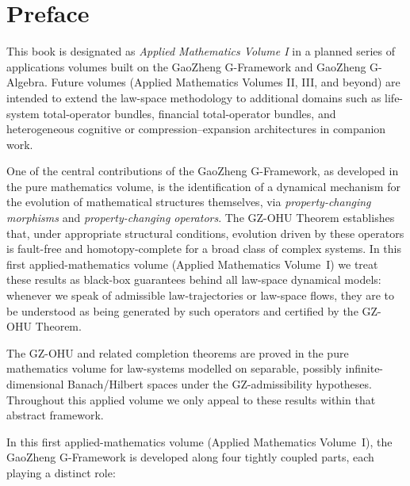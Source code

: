 \documentclass[11pt]{book}
\theoremstyle{plain}
\theoremstyle{definition}
\theoremstyle{remark}
\begin{document}
\chapter*{Preface}
\noindent This book is designated as \emph{Applied Mathematics Volume I} in a planned
series of applications volumes built on the GaoZheng G-Framework and GaoZheng
G-Algebra. Future volumes (Applied Mathematics Volumes II, III, and beyond)
are intended to extend the law-space methodology to additional domains such as
life-system total-operator bundles, financial total-operator bundles, and
heterogeneous cognitive or compression--expansion architectures in companion
work.


One of the central contributions of the GaoZheng G-Framework, as
developed in the pure mathematics volume, is the identification of
a dynamical mechanism for the evolution of mathematical structures
themselves, via \emph{property-changing morphisms} and
\emph{property-changing operators}. The GZ-OHU Theorem establishes
that, under appropriate structural conditions, evolution driven by
these operators is fault-free and homotopy-complete for a broad
class of complex systems. In this first applied-mathematics volume
(Applied Mathematics Volume~I) we treat these results as black-box
guarantees behind all law-space dynamical
models: whenever we speak of admissible law-trajectories or
law-space flows, they are to be understood as being generated by
such operators and certified by the GZ-OHU Theorem.

The GZ-OHU and related completion theorems are proved in the pure
mathematics volume for law-systems modelled on separable, possibly
infinite-dimensional Banach/Hilbert spaces under the GZ-admissibility
hypotheses. Throughout this applied volume we only appeal to these
results within that abstract framework.

In this first applied-mathematics volume (Applied Mathematics Volume~I), the GaoZheng G-Framework is developed
along four tightly coupled parts, each playing a distinct role:
\end{document}
